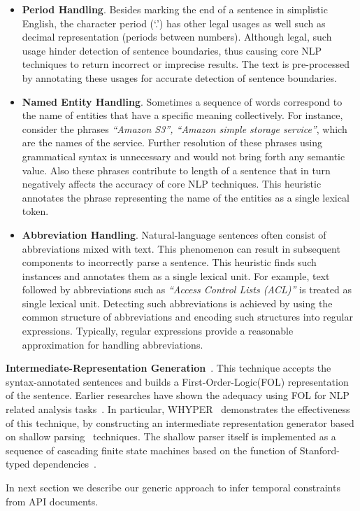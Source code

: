 \begin{itemize}

\item \textbf{Period Handling}. Besides marking the end of a sentence in simplistic English, the character period (`.') has other legal usages as well such as decimal representation (periods between numbers).
Although legal, such usage hinder detection of sentence boundaries, thus causing core NLP techniques to return incorrect or imprecise results.
The text is pre-processed by annotating these usages for accurate detection of sentence boundaries.
	
\item \textbf{Named Entity Handling}. Sometimes a sequence of words correspond to the name of entities that have a specific meaning collectively.
For instance, consider the phrases \textit{``Amazon S3'', ``Amazon simple storage service''}, which are the names of the service.
Further resolution of these phrases using grammatical syntax is unnecessary and would not bring forth any semantic value.
Also these phrases contribute to length of a sentence that in turn negatively affects the accuracy of core NLP techniques.
This heuristic annotates the phrase representing the name of the entities as a single lexical token.
	
\item \textbf{Abbreviation Handling}. Natural-language sentences often consist of abbreviations mixed with text.
This phenomenon can result in subsequent components to incorrectly parse a sentence.
This heuristic finds such instances and annotates them as a single lexical unit.
For example, text followed by abbreviations such as \textit{``Access Control Lists (ACL)''} is treated as single lexical unit.
Detecting such abbreviations is achieved by using the common structure of abbreviations and encoding such structures into regular expressions.
Typically, regular expressions provide a reasonable approximation for handling abbreviations.  

\end{itemize}

\textbf{Intermediate-Representation Generation}~\cite{pandita13:WHYPER}.
This technique accepts the syntax-annotated sentences and builds a First-Order-Logic(FOL) representation of the sentence.
Earlier researches have shown the adequacy using FOL for NLP related analysis tasks~\cite{Sinha2009,Sinha2010,pandita12:inferring}.
In particular, WHYPER~\cite{pandita13:WHYPER} demonstrates the effectiveness of this technique, by constructing an intermediate representation generator based on shallow parsing~\cite{Branimir2000} techniques. 
The shallow parser itself is implemented as a sequence of cascading finite state machines based on the function of Stanford-typed dependencies~\cite{Marneffe06LREC,Marneffe08COLING,Klein03,KleinNIPS03}.


In next section we describe our generic approach to infer temporal constraints from API documents. 